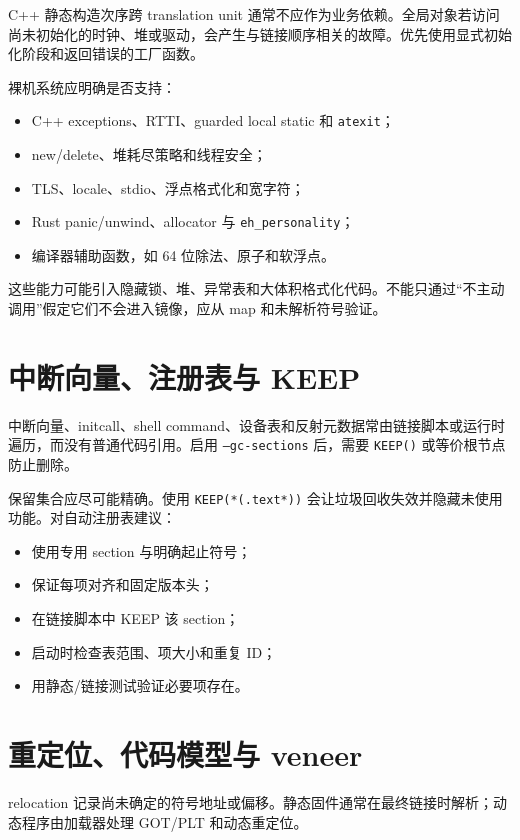 C++ 静态构造次序跨 translation unit 通常不应作为业务依赖。全局对象若访问尚未初始化的时钟、堆或驱动，会产生与链接顺序相关的故障。优先使用显式初始化阶段和返回错误的工厂函数。

裸机系统应明确是否支持：

\begin{itemize}
  \item C++ exceptions、RTTI、guarded local static 和 \texttt{atexit}；
  \item new/delete、堆耗尽策略和线程安全；
  \item TLS、locale、stdio、浮点格式化和宽字符；
  \item Rust panic/unwind、allocator 与 \texttt{eh\_personality}；
  \item 编译器辅助函数，如 64 位除法、原子和软浮点。
\end{itemize}

这些能力可能引入隐藏锁、堆、异常表和大体积格式化代码。不能只通过“不主动调用”假定它们不会进入镜像，应从 map 和未解析符号验证。

\section{中断向量、注册表与 KEEP}

中断向量、initcall、shell command、设备表和反射元数据常由链接脚本或运行时遍历，而没有普通代码引用。启用 \texttt{--gc-sections} 后，需要 \texttt{KEEP()} 或等价根节点防止删除。

保留集合应尽可能精确。使用 \texttt{KEEP(*(.text*))} 会让垃圾回收失效并隐藏未使用功能。对自动注册表建议：

\begin{itemize}
  \item 使用专用 section 与明确起止符号；
  \item 保证每项对齐和固定版本头；
  \item 在链接脚本中 KEEP 该 section；
  \item 启动时检查表范围、项大小和重复 ID；
  \item 用静态/链接测试验证必要项存在。
\end{itemize}

\section{重定位、代码模型与 veneer}

relocation 记录尚未确定的符号地址或偏移。静态固件通常在最终链接时解析；动态程序由加载器处理 GOT/PLT 和动态重定位。

